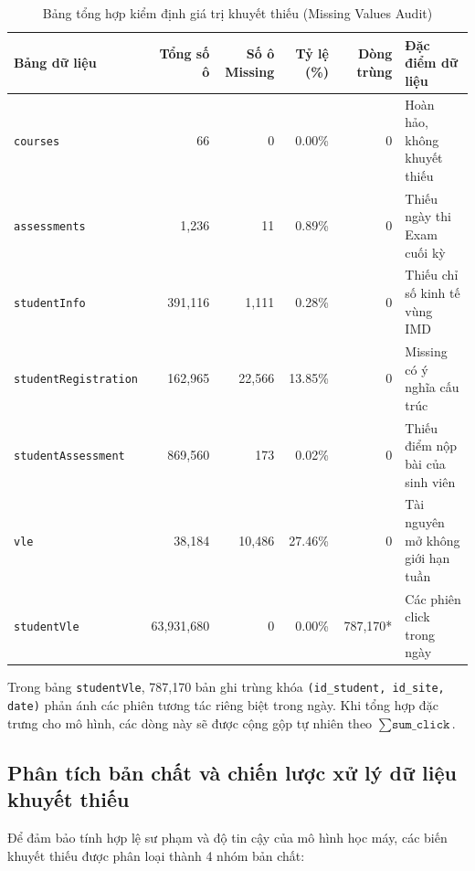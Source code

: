 \documentclass[11pt,a4paper]{article}
\begin{document}
\begin{table}[H]
\centering
\small
\renewcommand{\arraystretch}{1.25}
\setlength{\tabcolsep}{4.5pt}
\begin{tabularx}{\textwidth}{@{}l r r r r Y@{}}
\toprule
\textbf{Bảng dữ liệu} & \textbf{Tổng số ô} & \textbf{Số ô Missing} & \textbf{Tỷ lệ (\%)} & \textbf{Dòng trùng} & \textbf{Đặc điểm dữ liệu} \\
\midrule
\texttt{courses} & 66 & 0 & 0.00\% & 0 & Hoàn hảo, không khuyết thiếu \\
\texttt{assessments} & 1,236 & 11 & 0.89\% & 0 & Thiếu ngày thi Exam cuối kỳ \\
\texttt{studentInfo} & 391,116 & 1,111 & 0.28\% & 0 & Thiếu chỉ số kinh tế vùng IMD \\
\texttt{studentRegistration} & 162,965 & 22,566 & 13.85\% & 0 & Missing có ý nghĩa cấu trúc \\
\texttt{studentAssessment} & 869,560 & 173 & 0.02\% & 0 & Thiếu điểm nộp bài của sinh viên \\
\texttt{vle} & 38,184 & 10,486 & 27.46\% & 0 & Tài nguyên mở không giới hạn tuần \\
\texttt{studentVle} & 63,931,680 & 0 & 0.00\% & 787,170* & Các phiên click trong ngày \\
\bottomrule
\end{tabularx}
\caption{Bảng tổng hợp kiểm định giá trị khuyết thiếu (Missing Values Audit)}
\end{table}

Trong bảng \texttt{studentVle}, 787,170 bản ghi trùng khóa \texttt{(id\_student, id\_site, date)} phản ánh các phiên tương tác riêng biệt trong ngày. Khi tổng hợp đặc trưng cho mô hình, các dòng này sẽ được cộng gộp tự nhiên theo $\sum \texttt{sum\_click}$.

\subsection{Phân tích bản chất và chiến lược xử lý dữ liệu khuyết thiếu}

Để đảm bảo tính hợp lệ sư phạm và độ tin cậy của mô hình học máy, các biến khuyết thiếu được phân loại thành 4 nhóm bản chất:
\end{document}
